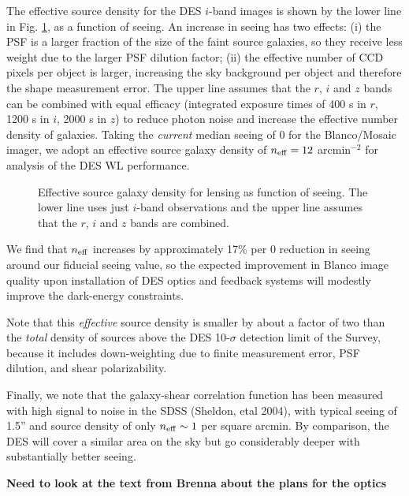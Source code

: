 \documentclass[preprint]{aastex}
\begin{document}
The effective source density for the DES $i$-band images is shown by the lower
line in Fig. \ref{fig:neff_seeing}, as a function of seeing. An increase in
seeing has two effects: (i) the PSF is a larger fraction of the size of the
faint source galaxies, so they receive less weight due to the larger PSF
dilution factor; (ii) the effective number of CCD pixels per object is larger,
increasing the sky background per object and therefore the shape measurement
error.  The upper line assumes that the $r$, $i$ and $z$ bands can be combined
with equal efficacy (integrated exposure times of 400 s in $r$, 1200 s in $i$,
2000 s in $z$) to reduce photon noise and increase the effective number density
of galaxies.  Taking the {\em current} median seeing of 0 for the
Blanco/Mosaic imager,
we adopt an effective source galaxy density of $n_{\rm eff} =12$ arcmin$^{-2}$
for analysis of the DES WL performance.

\begin{figure}[h]
\centerline{}
  \caption{
Effective source galaxy density for lensing as function of seeing.
The lower line uses just $i$-band observations and the upper line assumes
that the $r$, $i$ and $z$ bands are combined.
  }
  \label{fig:neff_seeing}
\end{figure}


We find that $n_{\rm eff}$ increases by approximately 17\% per 0
reduction in seeing around our fiducial seeing value, so the expected
improvement in Blanco image quality upon installation of DES optics
and feedback systems will modestly improve the dark-energy
constraints.

Note that this {\em effective} source density
is smaller by about a factor of two than the {\em total} density
of sources above the DES 10-$\sigma$ detection limit of the Survey,
because it includes down-weighting due to finite measurement error,
PSF dilution, and shear polarizability.

Finally, we
note that the galaxy-shear correlation function has been measured
with high signal to noise in the SDSS (Sheldon, etal 2004), with
typical seeing of 1.5'' and source density of only $n_{\rm eff} \sim 1$
per square arcmin. By comparison, the DES will cover a similar area
on the sky but go considerably deeper with substantially better
seeing.

{\bf Need to look at the text from Brenna about the plans for the
optics}
\end{document}
